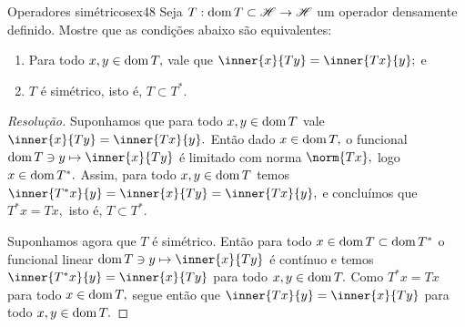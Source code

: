 \begin{exercício}{Operadores simétricos}{ex48}
  Seja \(T : \operatorname{dom}{T} \subset\mathscr{H} \to \mathscr{H}\) um operador densamente definido. Mostre que as condições abaixo são equivalentes:
  \begin{enumerate}[label=(\alph*)]
    \item Para todo \(x, y\in \operatorname{dom}{T},\) vale que \(\inner{x}{Ty} = \inner{Tx}{y};\) e
    \item \(T\) é simétrico, isto é, \(T \subset T^*.\)
  \end{enumerate}
\end{exercício}
\begin{proof}[Resolução]
  Suponhamos que para todo \(x, y \in \operatorname{dom}{T}\) vale \(\inner{x}{Ty} = \inner{Tx}{y}.\) Então dado \(x \in \operatorname{dom}{T},\) o funcional \(\dom{T} \ni y \mapsto \inner{x}{Ty}\) é limitado com norma \(\norm{Tx},\) logo \(x \in \operatorname{dom}{T^*}.\) Assim, para todo \(x, y \in \operatorname{dom}{T}\) temos \(\inner{T^*x}{y} = \inner{x}{Ty} = \inner{Tx}{y},\) e concluímos que \(T^*x = Tx,\) isto é, \(T \subset T^*.\)

  Suponhamos agora que \(T\) é simétrico. Então para todo \(x \in \operatorname{dom}{T} \subset \operatorname{dom}{T^*}\) o funcional linear \(\dom{T} \ni y \mapsto \inner{x}{Ty}\) é contínuo e temos \(\inner{T^*x}{y} = \inner{x}{Ty}\) para todo \(x, y \in \operatorname{dom}{T}.\) Como \(T^*x = Tx\) para todo \(x \in \operatorname{dom}{T},\) segue então que \(\inner{Tx}{y} = \inner{x}{Ty}\) para todo \(x, y \in \operatorname{dom}{T}.\)
\end{proof}

